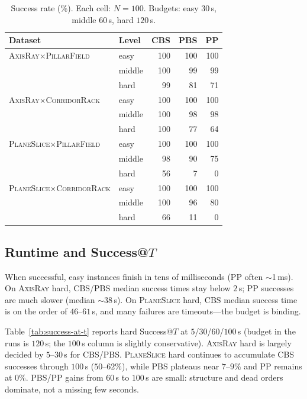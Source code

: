 \begin{table}[t]
  \centering
  \caption{Success rate (\%). Each cell: $N{=}100$. Budgets: easy $30$\,s,
  middle $60$\,s, hard $120$\,s.}
  \label{tab:success}
  \setlength{\tabcolsep}{4pt}
  \begin{tabular}{@{}llrrr@{}}
    \toprule
    Dataset & Level & CBS & PBS & PP \\
    \midrule
    \textsc{AxisRay}$\times$\textsc{PillarField}
      & easy   & 100 & 100 & 100 \\
      & middle & 100 &  99 &  99 \\
      & hard   &  99 &  81 &  71 \\
    \midrule
    \textsc{AxisRay}$\times$\textsc{CorridorRack}
      & easy   & 100 & 100 & 100 \\
      & middle & 100 &  98 &  98 \\
      & hard   & 100 &  77 &  64 \\
    \midrule
    \textsc{PlaneSlice}$\times$\textsc{PillarField}
      & easy   & 100 & 100 & 100 \\
      & middle &  98 &  90 &  75 \\
      & hard   &  56 &   7 &   0 \\
    \midrule
    \textsc{PlaneSlice}$\times$\textsc{CorridorRack}
      & easy   & 100 & 100 & 100 \\
      & middle & 100 &  96 &  80 \\
      & hard   &  66 &  11 &   0 \\
    \bottomrule
  \end{tabular}
\end{table}

\subsection{Runtime and Success@$T$}
\label{sec:runtime}

When successful, easy instances finish in tens of milliseconds (PP often
$\sim$1\,ms).
On \textsc{AxisRay} hard, CBS/PBS median success times stay below $2$\,s; PP
successes are much slower (median $\sim$38\,s).
On \textsc{PlaneSlice} hard, CBS median success time is on the order of
$46$--$61$\,s, and many failures are timeouts---the budget is binding.

Table~\ref{tab:success-at-t} reports hard Success@$T$ at $5$/$30$/$60$/$100$\,s
(budget in the runs is $120$\,s; the $100$\,s column is slightly conservative).
\textsc{AxisRay} hard is largely decided by $5$--$30$\,s for CBS/PBS.
\textsc{PlaneSlice} hard continues to accumulate CBS successes through $100$\,s
($50$--$62\%$), while PBS plateaus near $7$--$9\%$ and PP remains at $0\%$.
PBS/PP gains from $60$\,s to $100$\,s are small: structure and dead orders
dominate, not a missing few seconds.

